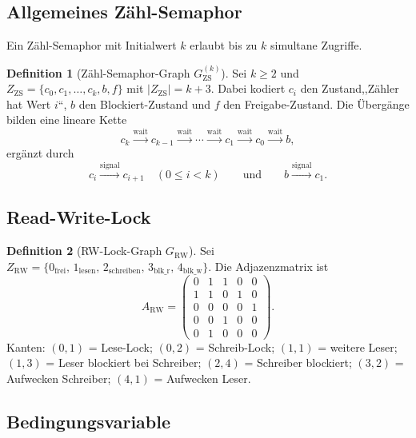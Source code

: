 ﻿\documentclass[a4paper,12pt]{article}
\theoremstyle{definition}
\newtheorem{definition}{Definition}
\begin{document}
\subsection{Allgemeines Zähl-Semaphor}

Ein Zähl-Semaphor mit Initialwert $k$ erlaubt bis zu $k$ simultane Zugriffe.

\begin{definition}[Zähl-Semaphor-Graph $G_{\mathrm{ZS}}^{(k)}$]
  \label{def:zs}
  Sei $k \geq 2$ und
  $Z_{\mathrm{ZS}} = \{c_0, c_1, \ldots, c_k, b, f\}$ mit $|Z_{\mathrm{ZS}}| = k+3$.
  Dabei kodiert $c_i$ den Zustand,,Zähler hat Wert $i$``,
  $b$ den Blockiert-Zustand und $f$ den Freigabe-Zustand.
  Die Übergänge bilden eine lineare Kette
  \[
    c_k \xrightarrow{\mathrm{wait}} c_{k-1} \xrightarrow{\mathrm{wait}}
    \cdots \xrightarrow{\mathrm{wait}} c_1 \xrightarrow{\mathrm{wait}} c_0
    \xrightarrow{\mathrm{wait}} b,
  \]
  ergänzt durch
  \[
    c_i \xrightarrow{\mathrm{signal}} c_{i+1} \quad (0 \leq i < k)
    \qquad\text{und}\qquad
    b \xrightarrow{\mathrm{signal}} c_1.
  \]
\end{definition}

\subsection{Read-Write-Lock}

\begin{definition}[RW-Lock-Graph $G_{\mathrm{RW}}$]
  \label{def:rw}
  Sei $Z_{\mathrm{RW}} = \{0_{\mathrm{frei}},\, 1_{\mathrm{lesen}},\, 2_{\mathrm{schreiben}},\, 3_{\mathrm{blk\_r}},\, 4_{\mathrm{blk\_w}}\}$.
  Die Adjazenzmatrix ist
  \[
    A_{\mathrm{RW}} =
    \begin{pmatrix}
      0 & 1 & 1 & 0 & 0 \\
      1 & 1 & 0 & 1 & 0 \\
      0 & 0 & 0 & 0 & 1 \\
      0 & 0 & 1 & 0 & 0 \\
      0 & 1 & 0 & 0 & 0
    \end{pmatrix}.
  \]
  Kanten: $(0,1)$ = Lese-Lock; $(0,2)$ = Schreib-Lock;
  $(1,1)$ = weitere Leser; $(1,3)$ = Leser blockiert bei Schreiber;
  $(2,4)$ = Schreiber blockiert; $(3,2)$ = Aufwecken Schreiber;
  $(4,1)$ = Aufwecken Leser.
\end{definition}

\subsection{Bedingungsvariable}
\end{document}
